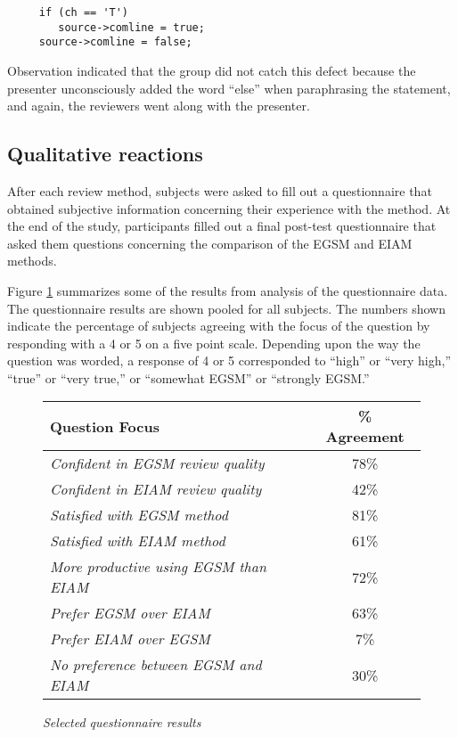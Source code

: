 \small
{}
\begin{verbatim}
     if (ch == 'T')
        source->comline = true;
     source->comline = false; 
\end{verbatim}
\normalsize

Observation indicated that the group did not catch this
defect because the presenter unconsciously added the word ``else'' when
paraphrasing the statement, and again, the reviewers went along
with the presenter.  


\subsection{Qualitative reactions}

After each review method, subjects were asked to fill out a questionnaire
that obtained subjective information concerning their experience with the 
method. At the end of the study, participants filled out a final post-test
questionnaire that asked them questions concerning the comparison of the
EGSM and EIAM methods. 

Figure \ref{fig:quest-results} summarizes some of the
results from analysis of the questionnaire data.  The questionnaire results
are shown pooled for all subjects.  The numbers shown indicate the
percentage of subjects agreeing with the focus of the question by
responding with a 4 or 5 on a five point scale.  Depending upon the way the
question was worded, a response of 4 or 5 corresponded to ``high'' or
``very high,'' ``true'' or ``very true,'' or ``somewhat EGSM'' or
``strongly EGSM.''

\begin{figure}[ht]
\small
  \begin{center}
  \begin{tabular}{|l|c|}
   \hline
Question Focus                   & \% Agreement \\
   \hline
{\em Confident in EGSM review quality} & 78\% \\
{\em Confident in EIAM review quality} & 42\% \\
{\em Satisfied with EGSM method} & 81\% \\
{\em Satisfied with EIAM method} & 61\% \\
{\em More productive using EGSM than EIAM} & 72\% \\
{\em Prefer EGSM over EIAM} & 63\% \\
{\em Prefer EIAM over EGSM} & 7\% \\
{\em No preference between EGSM and EIAM} & 30\% \\
  \hline
   \end{tabular}
  \end{center}
 \caption{{\em Selected questionnaire results}}
 \label{fig:quest-results}
\normalsize
\end{figure}

